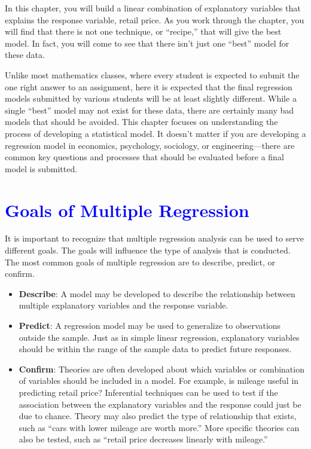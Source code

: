 \documentclass[
]{report}
\providecommand{\tightlist}{%
  \setlength{\itemsep}{0pt}\setlength{\parskip}{0pt}}
\begin{document}
In this chapter, you will build a linear combination of explanatory variables that explains the response variable, retail price. As you work through the chapter, you will find that there is not one technique, or ``recipe,'' that will give the best model. In fact, you will come to see that there isn't just one ``best'' model for these data.

Unlike most mathematics classes, where every student is expected to submit the one right answer to an assignment, here it is expected that the final regression models submitted by various students will be at least slightly different. While a single ``best'' model may not exist for these data, there are certainly many bad models that should be avoided. This chapter focuses on understanding the process of developing a statistical
model. It doesn't matter if you are developing a regression model in economics, psychology, sociology, or engineering---there are common key questions and processes that should be evaluated before a final model is submitted.

\hypertarget{section-27}{%
\section{\texorpdfstring{\textcolor{blue}{Goals of Multiple Regression}}{}}\label{section-27}}

It is important to recognize that multiple regression analysis can be used to serve different goals. The goals will influence the type of analysis that is conducted. The most common goals of multiple regression are to describe, predict, or confirm.

\begin{itemize}
\tightlist
\item
  \textbf{Describe}: A model may be developed to describe the relationship between multiple explanatory variables and the response variable.
\item
  \textbf{Predict}: A regression model may be used to generalize to observations outside the sample. Just as in simple linear regression, explanatory variables should be within the range of the sample data to predict future responses.
\item
  \textbf{Confirm}: Theories are often developed about which variables or combination of variables should be included in a model. For example, is mileage useful in predicting retail price? Inferential techniques can be used to test if the association between the explanatory variables and the response could just be due to chance. Theory may also predict the type of relationship that exists, such as ``cars with lower mileage are worth more.'' More specific theories can also be tested, such as ``retail price decreases linearly with mileage.''
\end{itemize}
\end{document}
